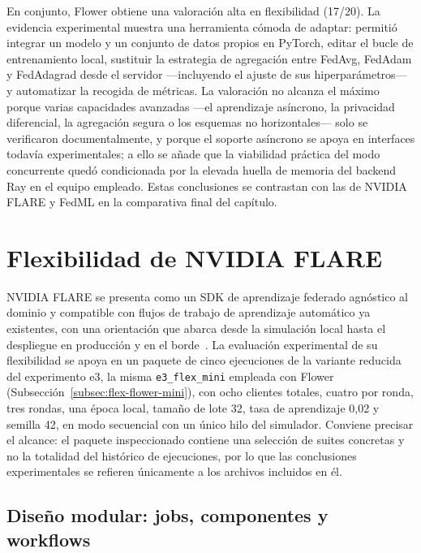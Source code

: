 En conjunto, Flower obtiene una valoración alta en flexibilidad (17/20). La
evidencia experimental muestra una herramienta cómoda de adaptar:
permitió integrar un modelo y un conjunto de datos propios en PyTorch, editar el
bucle de entrenamiento local, sustituir la estrategia de agregación entre FedAvg,
FedAdam y FedAdagrad desde el servidor —incluyendo el ajuste de sus
hiperparámetros— y automatizar la recogida de métricas. La valoración no alcanza
el máximo porque varias capacidades avanzadas —el aprendizaje asíncrono, la
privacidad diferencial, la agregación segura o los esquemas no horizontales— solo se
verificaron documentalmente, y porque el soporte asíncrono se apoya en interfaces
todavía experimentales; a ello se añade que la viabilidad práctica del modo
concurrente quedó condicionada por la elevada huella de memoria del backend Ray en
el equipo empleado. Estas conclusiones se contrastan con las de NVIDIA FLARE y FedML
en la comparativa final del capítulo.


\section{Flexibilidad de NVIDIA FLARE}\label{sec:flex-nvflare}

NVIDIA FLARE se presenta como un SDK de aprendizaje federado agnóstico al dominio
y compatible con flujos de trabajo de aprendizaje automático ya existentes, con
una orientación que abarca desde la simulación local hasta el despliegue en
producción y en el borde~\parencite{roth2022nvflare,nvflareWelcome}. La evaluación
experimental de su flexibilidad se apoya en un paquete de cinco ejecuciones de la
variante reducida del experimento e3, la misma \texttt{e3\_flex\_mini} empleada con
Flower (Subsección~\ref{subsec:flex-flower-mini}), con ocho clientes totales,
cuatro por ronda, tres rondas, una época local, tamaño de lote 32, tasa de
aprendizaje 0,02 y semilla 42, en modo secuencial con un único hilo del simulador.
Conviene precisar el alcance: el paquete inspeccionado contiene una selección de
suites concretas y no la totalidad del histórico de ejecuciones, por lo que las
conclusiones experimentales se refieren únicamente a los archivos incluidos en él.

\subsection{Diseño modular: jobs, componentes y workflows}\label{subsec:flex-nvflare-modular}

